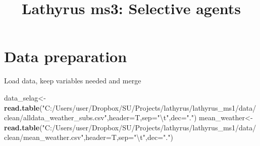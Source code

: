 \documentclass[
]{article}
\title{Lathyrus ms3: Selective agents}
\author{}
\date{\vspace{-2.5em}}
\newenvironment{Shaded}{\begin{snugshade}}{\end{snugshade}}
\newcommand{\CharTok}[1]{\textcolor[rgb]{0.31,0.60,0.02}{#1}}
\newcommand{\DataTypeTok}[1]{\textcolor[rgb]{0.13,0.29,0.53}{#1}}
\newcommand{\KeywordTok}[1]{\textcolor[rgb]{0.13,0.29,0.53}{\textbf{#1}}}
\newcommand{\NormalTok}[1]{#1}
\newcommand{\StringTok}[1]{\textcolor[rgb]{0.31,0.60,0.02}{#1}}
\begin{document}
\maketitle

{
\setcounter{tocdepth}{4}
\tableofcontents
}
\hypertarget{data-preparation}{%
\section{Data preparation}\label{data-preparation}}

Load data, keep variables needed and merge

\begin{Shaded}
\begin{Highlighting}[]
\NormalTok{data_selag<-}\KeywordTok{read.table}\NormalTok{(}\StringTok{"C:/Users/user/Dropbox/SU/Projects/lathyrus/lathyrus_ms1/data/clean/alldata_weather_subs.csv"}\NormalTok{,}\DataTypeTok{header=}\NormalTok{T,}\DataTypeTok{sep=}\StringTok{"}\CharTok{\textbackslash{}t}\StringTok{"}\NormalTok{,}\DataTypeTok{dec=}\StringTok{"."}\NormalTok{) }
\NormalTok{mean_weather<-}\KeywordTok{read.table}\NormalTok{(}\StringTok{"C:/Users/user/Dropbox/SU/Projects/lathyrus/lathyrus_ms1/data/clean/mean_weather.csv"}\NormalTok{,}\DataTypeTok{header=}\NormalTok{T,}\DataTypeTok{sep=}\StringTok{"}\CharTok{\textbackslash{}t}\StringTok{"}\NormalTok{,}\DataTypeTok{dec=}\StringTok{"."}\NormalTok{)}
\end{Highlighting}
\end{Shaded}
\end{document}
